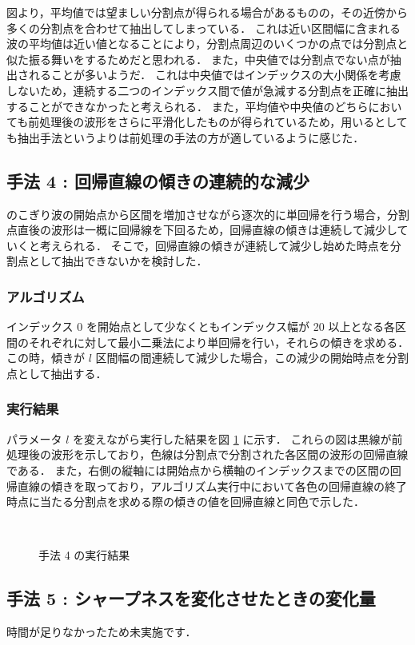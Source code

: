 \documentclass[a4j]{jarticle}
\begin{document}
図より，平均値では望ましい分割点が得られる場合があるものの，その近傍から多くの分割点を合わせて抽出してしまっている．
これは近い区間幅に含まれる波の平均値は近い値となることにより，分割点周辺のいくつかの点では分割点と似た振る舞いをするためだと思われる．
また，中央値では分割点でない点が抽出されることが多いようだ．
これは中央値ではインデックスの大小関係を考慮しないため，連続する二つのインデックス間で値が急減する分割点を正確に抽出することができなかったと考えられる．
また，平均値や中央値のどちらにおいても前処理後の波形をさらに平滑化したものが得られているため，用いるとしても抽出手法というよりは前処理の手法の方が適しているように感じた．

\subsection{手法 4 : 回帰直線の傾きの連続的な減少}
のこぎり波の開始点から区間を増加させながら逐次的に単回帰を行う場合，分割点直後の波形は一概に回帰線を下回るため，回帰直線の傾きは連続して減少していくと考えられる．
そこで，回帰直線の傾きが連続して減少し始めた時点を分割点として抽出できないかを検討した．

\subsubsection{アルゴリズム}
インデックス 0 を開始点として少なくともインデックス幅が 20 以上となる各区間のそれぞれに対して最小二乗法により単回帰を行い，それらの傾きを求める．
この時，傾きが $l$ 区間幅の間連続して減少した場合，この減少の開始時点を分割点として抽出する．

\subsubsection{実行結果}
パラメータ $l$ を変えながら実行した結果を図 \ref{resultalg4} に示す．
これらの図は黒線が前処理後の波形を示しており，色線は分割点で分割された各区間の波形の回帰直線である．
また，右側の縦軸には開始点から横軸のインデックスまでの区間の回帰直線の傾きを取っており，アルゴリズム実行中において各色の回帰直線の終了時点に当たる分割点を求める際の傾きの値を回帰直線と同色で示した．
\begin{figure}[tb]
\begin{center}
\\
\end{center}
\end{figure}
\begin{figure}[tb]
\begin{center}
\caption{手法 4 の実行結果}
\label{resultalg4}
\end{center}
\end{figure}

\subsection{手法 5 : シャープネスを変化させたときの変化量}
時間が足りなかったため未実施です．
\end{document}
